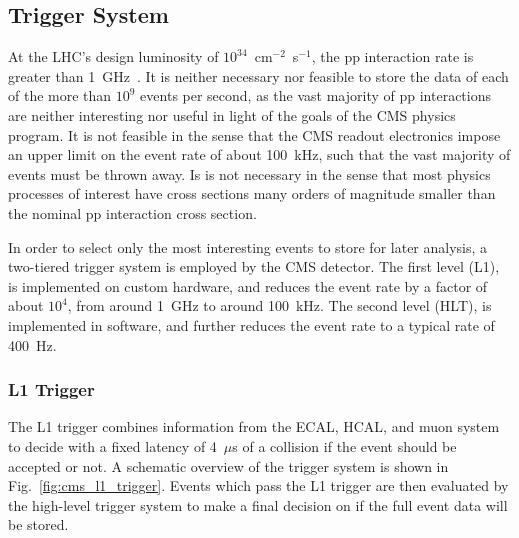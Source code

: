 \subsection{Trigger System} \label{sec:cms_trigger}
At the LHC's design luminosity of $10^{34}$~cm$^{-2}$~s$^{-1}$, the pp interaction rate is greater than 1~GHz~\cite{Khachatryan:2016bia}.
It is neither necessary nor feasible to store the data of each of the more than $10^9$ events per second, as the vast majority of pp interactions are neither interesting nor useful in light of the goals of the CMS physics program.
It is not feasible in the sense that the CMS readout electronics impose an upper limit on the event rate of about 100~kHz, such that the vast majority of events must be thrown away.
Is is not necessary in the sense that most physics processes of interest have cross sections many orders of magnitude smaller than the nominal pp interaction cross section.

In order to select only the most interesting events to store for later analysis, a two-tiered trigger system is employed by the CMS detector.
The first level (L1), is implemented on custom hardware, and reduces the event rate by a factor of about $10^4$, from around 1~GHz to around 100~kHz.
The second level (HLT), is implemented in software, and further reduces the event rate to a typical rate of 400~Hz.

\subsubsection{L1 Trigger}
The L1 trigger combines information from the ECAL, HCAL, and muon system to decide with a fixed latency of 4~$\mu$s of a collision if the event should be accepted or not.
A schematic overview of the trigger system is shown in Fig.~\ref{fig:cms_l1_trigger}.
Events which pass the L1 trigger are then evaluated by the high-level trigger system to make a final decision on if the full event data will be stored.

